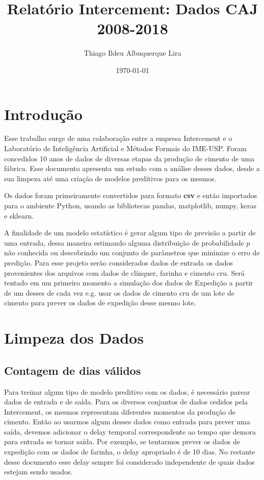 \documentclass[a4paper]{article}
\title{Relatório Intercement: Dados CAJ 2008-2018}
\author{Thiago Ildeu Albuquerque Lira}
\date{\today}
\begin{document}
\maketitle

\newpage
\tableofcontents

\newpage

\section{Introdução}

Esse trabalho surge de uma colaboração entre a empresa Intercement e o Laboratório de Inteligência Artificial e Métodos Formais do IME-USP. Foram concedidos 10 anos de dados de diversas etapas da produção de cimento de uma fábrica. Esse documento apresenta um estudo com a análise desses dados, desde a sua limpeza até uma criação de modelos preditivos para os mesmos.

Os dados foram primeiramente convertidos para formato \textbf{csv} e então importados para o ambiente Python, usando as bibliotecas pandas, matplotlib, numpy, keras e sklearn.

A finalidade de um modelo estatístico é gerar algum tipo de previsão a partir de uma entrada, dessa maneira estimando alguma distribuição de probabilidade $p$ não conhecida ou descobrindo um conjunto de parâmetros que minimize o erro de predição. Para esse projeto serão considerados dados de entrada os dados provenientes dos arquivos com dados de clínquer, farinha e cimento cru. Será tentado em um primeiro momento a simulação dos dados de Expedição a partir de um desses de cada vez e.g. usar os dados de cimento cru de um lote de cimento para prever os dados de expedição desse mesmo lote.


\section{Limpeza dos Dados}

\subsection{Contagem de dias válidos}

Para treinar algum tipo de modelo preditivo com os dados, é necessário parear dados de entrada e de saída. Para os diversos conjuntos de dados cedidos pela Intercement, os mesmos representam diferentes momentos da produção de cimento. Então ao usarmos algum desses dados como entrada para prever uma saída, devemos adicionar o delay temporal correspondente ao tempo que demora para entrada se tornar saída. Por exemplo, se tentarmos prever os dados de expedição com os dados de farinha, o delay apropriado é de 10 dias. No restante desse documento esse delay sempre foi considerado independente de quais dados estejam sendo usados.
\end{document}
